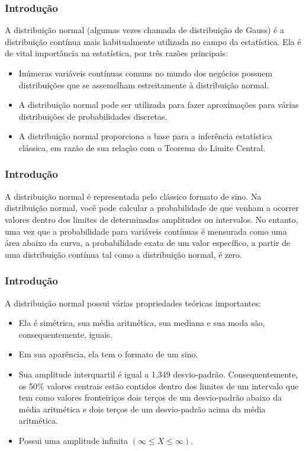 \documentclass[14pt,aspectratio=1610]{beamer}
\begin{document}
\begin{frame}{}
\frametitle{Introdução}
\begin{block}{}
\justifying
A distribuição normal (algumas vezes chamada de distribuição de Gauss) é a distribuição contínua mais habitualmente utilizada no campo da estatística. Ela é de vital importância na estatística, por três razões principais:
\begin{itemize}
\item Inúmeras variáveis contínuas comuns no mundo dos negócios possuem distribuições que se assemelham estreitamente à distribuição normal. \pause
\item A distribuição normal pode ser utilizada para fazer aproximações para várias distribuições de probabilidades discretas.\pause
\item A distribuição normal proporciona a base para a inferência estatística clássica, em razão de sua relação com o Teorema do Limite Central.
\end{itemize}
\end{block}
\end{frame}

\begin{frame}{}
\frametitle{Introdução}
\begin{block}{}
\justifying
A distribuição normal é representada pelo clássico formato de sino. Na distribuição normal, você pode calcular a probabilidade de que venham a ocorrer valores dentro dos limites de determinadas amplitudes ou intervalos. No entanto, uma vez que a probabilidade para variáveis contínuas é mensurada como uma área abaixo da curva, a probabilidade exata de um valor específico, a partir de uma distribuição contínua tal como a distribuição normal, é zero. 
\end{block}
\end{frame}

\begin{frame}{}
\frametitle{Introdução}
\begin{block}{}
\justifying
A distribuição normal possui várias propriedades teóricas importantes:
\begin{itemize}
\item Ela é simétrica, sua média aritmética, sua mediana e sua moda são, consequentemente, iguais.
\item Em sua aparência, ela tem o formato de um sino.
\item Sua amplitude interquartil é igual a 1,349 desvio-padrão. Consequentemente, os 50\% valores centrais estão contidos dentro dos limites de um intervalo que tem como valores fronteiriços dois terços de um desvio-padrão abaixo da média aritmética e dois terços de um desvio-padrão acima da média aritmética.
\item Possui uma amplitude infinita $(\infty\leq X\leq \infty).$
\end{itemize}
\end{block}
\end{frame}
\end{document}

